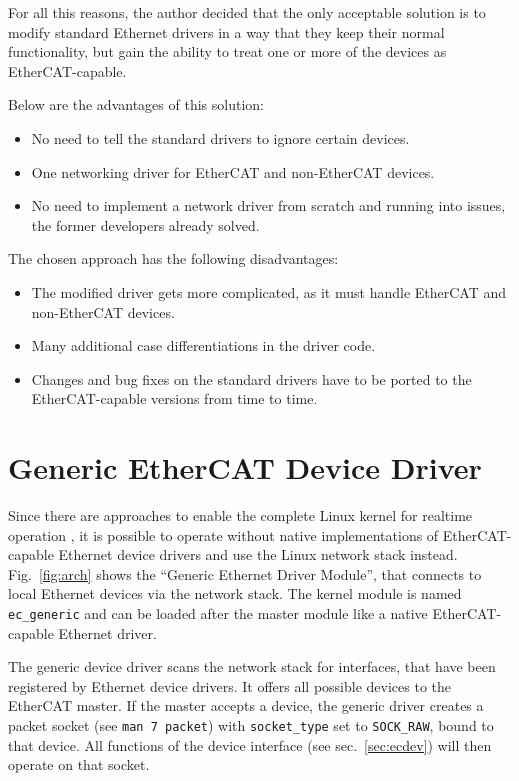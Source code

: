 \documentclass[a4paper,12pt,BCOR6mm,bibtotoc,idxtotoc]{scrbook}
\begin{document}
For all this reasons, the author decided that the only acceptable solution is
to modify standard Ethernet drivers in a way that they keep their normal
functionality, but gain the ability to treat one or more of the devices as
EtherCAT-capable.

Below are the advantages of this solution:

\begin{itemize}
\item No need to tell the standard drivers to ignore certain devices.
\item One networking driver for EtherCAT and non-EtherCAT devices.
\item No need to implement a network driver from scratch and running
  into issues, the former developers already solved.
\end{itemize}

The chosen approach has the following disadvantages:

\begin{itemize}
\item The modified driver gets more complicated, as it must handle
  EtherCAT and non-EtherCAT devices.
\item Many additional case differentiations in the driver code.
\item Changes and bug fixes on the standard drivers have to be ported
  to the Ether\-CAT-capable versions from time to time.
\end{itemize}


\section{Generic EtherCAT Device Driver}
\label{sec:generic-driver}

Since there are approaches to enable the complete Linux kernel for realtime
operation \cite{rt-preempt}, it is possible to operate without native
implementations of EtherCAT-capable Ethernet device drivers and use the Linux
network stack instead. Fig.~\ref{fig:arch} shows the ``Generic Ethernet Driver
Module'', that connects to local Ethernet devices via the network stack. The
kernel module is named \lstinline+ec_generic+ and can be loaded after the
master module like a native EtherCAT-capable Ethernet driver.

The generic device driver scans the network stack for interfaces, that have
been registered by Ethernet device drivers. It offers all possible devices to
the EtherCAT master. If the master accepts a device, the generic driver
creates a packet socket (see \lstinline+man 7 packet+) with
\lstinline+socket_type+ set to \lstinline+SOCK_RAW+, bound to that device. All
functions of the device interface (see sec.~\ref{sec:ecdev}) will then operate
on that socket.
\end{document}
